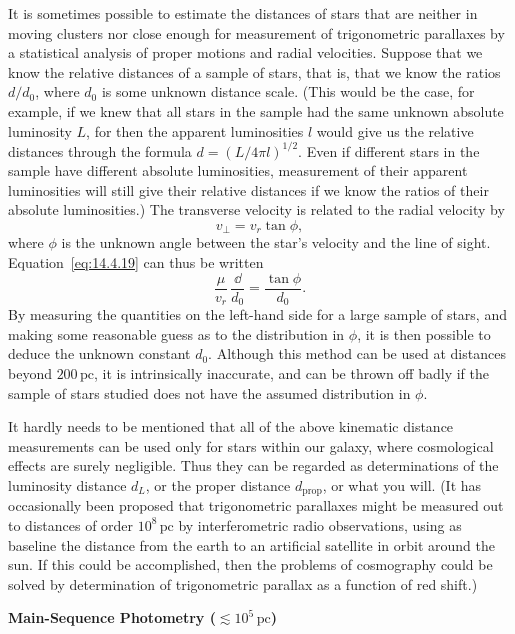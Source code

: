It is sometimes possible to estimate the distances of stars that are neither
in moving clusters nor close enough for measurement of trigonometric
parallaxes by a statistical analysis of proper motions and radial
velocities. Suppose that we know the relative distances of a sample of
stars, that is, that we know the ratios \(d/d_0\), where \(d_0\) is some
unknown distance scale. (This would be the case, for example, if we knew
that all stars in the sample had the same unknown absolute luminosity \(L\),
for then the apparent luminosities \(l\) would give us the relative
distances through the formula \(d=(L/4\pi l)^{1/2}\). Even if different
stars in the sample have different absolute luminosities, measurement of
their apparent luminosities will still give their relative distances if we
know the ratios of their absolute luminosities.) The transverse velocity is
related to the radial velocity by
\[
  v_\perp=v_r\tan\phi,
\]
where \(\phi\) is the unknown angle between the star's velocity and the line
of sight. Equation~\eqref{eq:14.4.19} can thus be written
\[
  \frac{\mu}{v_r}\,\frac{\dd}{d_0}
  =
  \frac{\tan\phi}{d_0}.
\]
By measuring the quantities on the left-hand side for a large sample of
stars, and making some reasonable guess as to the distribution in \(\phi\),
it is then possible to deduce the unknown constant \(d_0\). Although this
method can be used at distances beyond \(200\,\mathrm{pc}\), it is
intrinsically inaccurate, and can be thrown off badly if the sample of stars
studied does not have the assumed distribution in \(\phi\).

It hardly needs to be mentioned that all of the above kinematic distance
measurements can be used only for stars within our galaxy, where
cosmological effects are surely negligible. Thus they can be regarded as
determinations of the luminosity distance \(d_L\), or the proper distance
\(d_{\mathrm{prop}}\), or what you will. (It has occasionally been proposed
that trigonometric parallaxes might be measured out to distances of order
\(10^8\,\mathrm{pc}\) by interferometric radio observations, using as
baseline the distance from the earth to an artificial satellite in orbit
around the sun. If this could be accomplished, then the problems of
cosmography could be solved by determination of trigonometric parallax as a
function of red shift.)

\medskip
\noindent\textbf{Main-Sequence Photometry (\(\lesssim10^5\,\mathrm{pc}\))}
\par\smallskip

